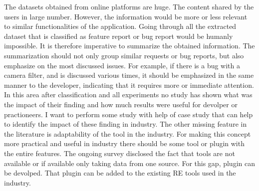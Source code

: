 	The datasets obtained from online platforms are huge. The content shared by the users in large number. However, the information would be more or less relevant to similar
functionalities of the application. Going through all the extracted dataset that is classified as
feature report or bug report would be humanly impossible. It is therefore imperative to
summarize the obtained information. The summarization should not only group similar requests
or bug reports, but also emphasize on the most discussed issues. For example, if there is a bug
with a camera filter, and is discussed various times, it should be emphasized in the same manner
to the developer, indicating that it requires more or immediate attention.\\

	In this area after classification and all experiments no study has shown what was the impact 
of their finding and how much results were useful for devolper or practioneers. I want to perform some study with help of  case study that can help to identify the impact
 of these finding in industry. The other missing feature in the literature is adaptability of the tool in the industry. For making
this concept more practical and useful in industry there should be some tool or plugin with
the entire features. The ongoing survey disclosed the fact that tools are not available or if available only
taking data from one source. For this gap, plugin can be devolped. That plugin can be added
to the existing RE tools used in the industry.